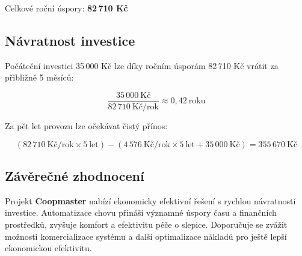 Celkové roční úspory: \textbf{82\,710 Kč}

\subsection*{Návratnost investice}

Počáteční investici 35\,000 Kč lze díky ročním úsporám 82\,710 Kč vrátit za přibližně 5 měsíců:

\[
\frac{35\,000~\text{Kč}}{82\,710~\text{Kč/rok}} \approx 0{,}42~\text{roku}
\]

Za pět let provozu lze očekávat čistý přínos:

\[
(82\,710~\text{Kč/rok} \times 5~\text{let}) - (4\,576~\text{Kč/rok} \times 5~\text{let} + 35\,000~\text{Kč}) = 355\,670~\text{Kč}
\]

\subsection*{Závěrečné zhodnocení}

Projekt \textbf{Coopmaster} nabízí ekonomicky efektivní řešení s rychlou návratností investice.
Automatizace chovu přináší významné úspory času a finančních prostředků, zvyšuje komfort a efektivitu péče o slepice.
Doporučuje se zvážit možnosti komercializace systému a další optimalizace nákladů pro ještě lepší ekonomickou efektivitu.


